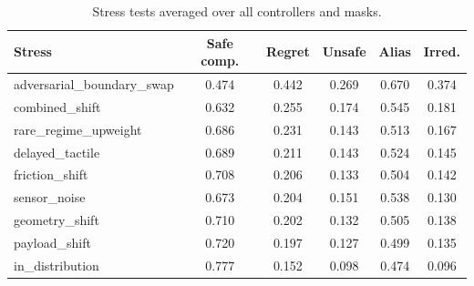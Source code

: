\begin{table}[t]
\centering
\caption{Stress tests averaged over all controllers and masks.}
\label{tab:stress-summary}
\small
\begin{tabular}{lccccc}
\toprule
Stress & Safe comp. & Regret & Unsafe & Alias & Irred. \\
\midrule
adversarial\_boundary\_swap & 0.474 & 0.442 & 0.269 & 0.670 & 0.374 \\
combined\_shift & 0.632 & 0.255 & 0.174 & 0.545 & 0.181 \\
rare\_regime\_upweight & 0.686 & 0.231 & 0.143 & 0.513 & 0.167 \\
delayed\_tactile & 0.689 & 0.211 & 0.143 & 0.524 & 0.145 \\
friction\_shift & 0.708 & 0.206 & 0.133 & 0.504 & 0.142 \\
sensor\_noise & 0.673 & 0.204 & 0.151 & 0.538 & 0.130 \\
geometry\_shift & 0.710 & 0.202 & 0.132 & 0.505 & 0.138 \\
payload\_shift & 0.720 & 0.197 & 0.127 & 0.499 & 0.135 \\
in\_distribution & 0.777 & 0.152 & 0.098 & 0.474 & 0.096 \\
\bottomrule
\end{tabular}
\end{table}
